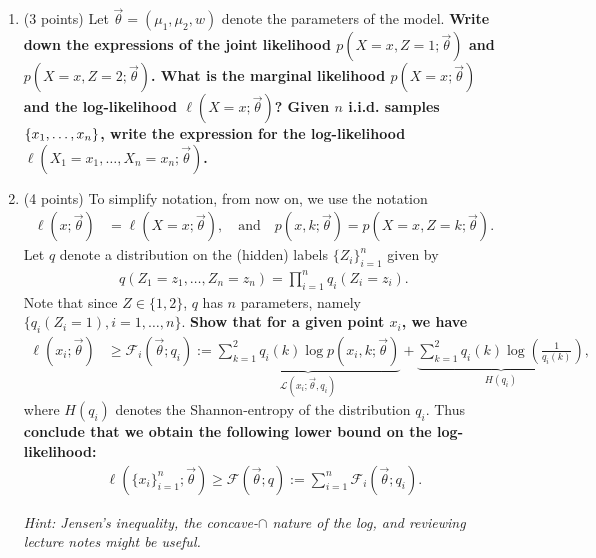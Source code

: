 \documentclass[11pt]{article}
\begin{document}
\begin{enumerate}[label=(\alph*)] 
\item (3 points) Let $\vec{\theta} =(\mu_1, \mu_2, w)$ denote the parameters
of the
model.
\textbf{Write down the expressions of the joint likelihood
$p(X=x, Z=1; \vec{\theta})$ and $p(X=x, Z=2; \vec{\theta})$.
What is the marginal likelihood $p(X=x; \vec{\theta})$ and the log-likelihood
$\ell(X=x; \vec{\theta})$?
Given $n$ i.i.d. samples $\left\{ x_1, \ldots, x_n \right \}$, write the expression
for the log-likelihood $\ell(X_1=x_1, \ldots, X_n=x_n; \vec{\theta})$.}

\item   (4 points)
To simplify notation, from now on, we use the notation 
\begin{align*}
 \ell(x; \vec{\theta}) &= \ell({X} = {x}; \vec{\theta}),
 \quad\text{and}
 \quad p(x, k; \vec\theta) = p(X=x, Z=k; \vec\theta).
\end{align*}
Let $q$ denote a distribution on the (hidden) labels $\{Z_i\}_{i=1}^n$ given by
\begin{align}
  q(Z_1 = z_1, \ldots, Z_n = z_n) = \prod_{i=1}^n q_i(Z_i=z_i). \label{eq:q}
\end{align}
Note that since $Z \in\{1, 2\}$, $q$ has $n$ parameters, namely $\{q_i(Z_i=1), i=1, \ldots, n\}$.
{\bf Show that for a given point $x_i$, we have }
\begin{align}
  \ell(x_i; \vec{\theta})
  &\geq \mathcal{F}_i(\vec{\theta}; q_i)
  :=\underbrace{\sum_{k=1}^2 q_i(k) \log p (x_i, k; \vec{\theta})}_{\mathcal{L}(x_i; \vec\theta, q_i)} + \underbrace{\sum_{k=1}^2 {q}_i(k) \log\left(\frac{1}{{q}_i(k)}\right)}_{H(q_i)}, 
  \label{eq:lower_bound}
\end{align}
where $H({q}_i)$ denotes the Shannon-entropy of the distribution
$q_i$. 
Thus {\bf conclude that we obtain the following lower bound on the log-likelihood:}
\begin{align}
  \ell(\{x_i\}_{i=1}^n; \vec\theta)  \geq 
  \mathcal{F}(\vec{\theta}; q) := \sum_{i=1}^n\mathcal{F}_i(\vec{\theta}; {q}_i).
  \label{eq:F_defn}
\end{align}

{\em Hint: Jensen's inequality, the concave-$\cap$ nature of the log,
  and reviewing lecture notes might be useful.} 


\end{enumerate}
\end{document}
